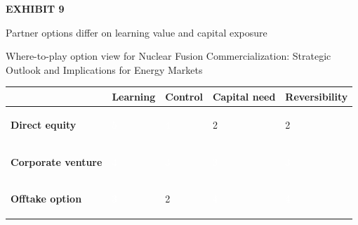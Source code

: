 \documentclass[10pt,a4paper]{article}
\begin{document}
\clearpage
{\textcolor{BOGreen}{\scriptsize\bfseries EXHIBIT 9}}\par\vspace{4pt}
{\sffamily\fontsize{17}{21}\selectfont\color{BONavy} Partner options differ on learning value and capital exposure}\par
{\small\color{BOText} Where-to-play option view for Nuclear Fusion Commercialization: Strategic Outlook and Implications for Energy Markets}\par\vspace{6pt}
{\scriptsize\begin{tabular}{p{38mm}>{\centering\arraybackslash}p{21mm}>{\centering\arraybackslash}p{21mm}>{\centering\arraybackslash}p{21mm}>{\centering\arraybackslash}p{21mm}}
 & {\bfseries Learning} & {\bfseries Control} & {\bfseries Capital need} & {\bfseries Reversibility} \\
\hline
{\bfseries Direct equity} & \colorbox{BOGreen}{\textcolor{white}{\strut\hspace{5pt}5\hspace{5pt}}} & \colorbox{BOGreen}{\textcolor{white}{\strut\hspace{5pt}4\hspace{5pt}}} & \colorbox{BOLight}{\textcolor{BOText}{\strut\hspace{5pt}2\hspace{5pt}}} & \colorbox{BOLight}{\textcolor{BOText}{\strut\hspace{5pt}2\hspace{5pt}}} \\
{\bfseries Corporate venture} & \colorbox{BOGreen}{\textcolor{white}{\strut\hspace{5pt}4\hspace{5pt}}} & \colorbox{BOBlue}{\textcolor{white}{\strut\hspace{5pt}3\hspace{5pt}}} & \colorbox{BOBlue}{\textcolor{white}{\strut\hspace{5pt}3\hspace{5pt}}} & \colorbox{BOBlue}{\textcolor{white}{\strut\hspace{5pt}3\hspace{5pt}}} \\
{\bfseries Offtake option} & \colorbox{BOBlue}{\textcolor{white}{\strut\hspace{5pt}3\hspace{5pt}}} & \colorbox{BOLight}{\textcolor{BOText}{\strut\hspace{5pt}2\hspace{5pt}}} & \colorbox{BOGreen}{\textcolor{white}{\strut\hspace{5pt}4\hspace{5pt}}} & \colorbox{BOGreen}{\textcolor{white}{\strut\hspace{5pt}4\hspace{5pt}}} \\

\end{tabular}}
\end{document}
